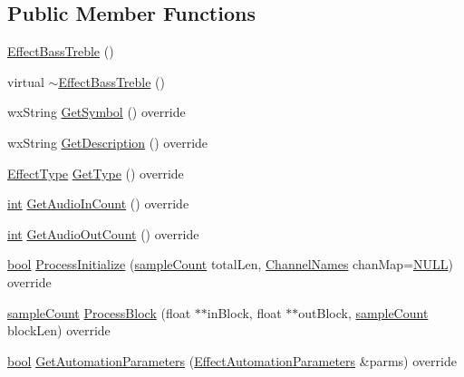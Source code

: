 \subsection*{Public Member Functions}
\begin{DoxyCompactItemize}
\item 
\hyperlink{class_effect_bass_treble_acf576c91673a4fcf4788b5eea3865d51}{Effect\+Bass\+Treble} ()
\item 
virtual \hyperlink{class_effect_bass_treble_a839882b64d64d7f06381d99a97add5dc}{$\sim$\+Effect\+Bass\+Treble} ()
\item 
wx\+String \hyperlink{class_effect_bass_treble_a26320df2e99a98da8e705ee4186115e3}{Get\+Symbol} () override
\item 
wx\+String \hyperlink{class_effect_bass_treble_aa6cce373f33bbca91225c2f316c02937}{Get\+Description} () override
\item 
\hyperlink{_effect_interface_8h_a4809a7bb3fd1a421902a667cc1405d43}{Effect\+Type} \hyperlink{class_effect_bass_treble_a429053ff6704676d8860d0f0ce91e46c}{Get\+Type} () override
\item 
\hyperlink{xmltok_8h_a5a0d4a5641ce434f1d23533f2b2e6653}{int} \hyperlink{class_effect_bass_treble_a101f7afde074f1cb327861e2d8e7a886}{Get\+Audio\+In\+Count} () override
\item 
\hyperlink{xmltok_8h_a5a0d4a5641ce434f1d23533f2b2e6653}{int} \hyperlink{class_effect_bass_treble_a66ead0b4f6871ee57fb8222e7f332226}{Get\+Audio\+Out\+Count} () override
\item 
\hyperlink{mac_2config_2i386_2lib-src_2libsoxr_2soxr-config_8h_abb452686968e48b67397da5f97445f5b}{bool} \hyperlink{class_effect_bass_treble_aa0e1fdf2c9a14e77e5c360d400579ec4}{Process\+Initialize} (\hyperlink{include_2audacity_2_types_8h_afa427e1f521ea5ec12d054e8bd4d0f71}{sample\+Count} total\+Len, \hyperlink{include_2audacity_2_types_8h_a4f0f42a04250c39bbe0ce6cb26aa3b48}{Channel\+Names} chan\+Map=\hyperlink{px__mixer_8h_a070d2ce7b6bb7e5c05602aa8c308d0c4}{N\+U\+LL}) override
\item 
\hyperlink{include_2audacity_2_types_8h_afa427e1f521ea5ec12d054e8bd4d0f71}{sample\+Count} \hyperlink{class_effect_bass_treble_a24de22dd6ec155683a673b0b5df1ffcb}{Process\+Block} (float $\ast$$\ast$in\+Block, float $\ast$$\ast$out\+Block, \hyperlink{include_2audacity_2_types_8h_afa427e1f521ea5ec12d054e8bd4d0f71}{sample\+Count} block\+Len) override
\item 
\hyperlink{mac_2config_2i386_2lib-src_2libsoxr_2soxr-config_8h_abb452686968e48b67397da5f97445f5b}{bool} \hyperlink{class_effect_bass_treble_a53a0f195020f3c144a4d60ce9555a492}{Get\+Automation\+Parameters} (\hyperlink{class_effect_automation_parameters}{Effect\+Automation\+Parameters} \&parms) override

\end{DoxyCompactItemize}
